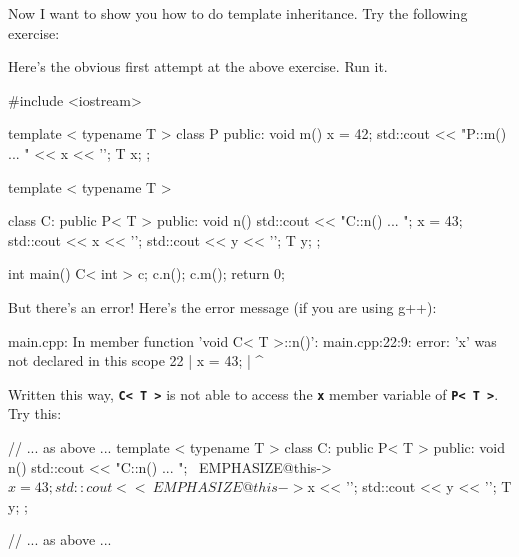 Now I want to show you how to do template inheritance. Try the following
exercise:

Here's the obvious first attempt at the above exercise. Run it.
\begin{console}
#include <iostream>

template < typename T >
class P
{
public:
        void m()
        {
              x = 42;
              std::cout << "P::m() ... " << x << '\n';
        }
        T x;
};

template < typename T >

class C: public P< T >
{
public:
        void n()
        {
             std::cout << "C::n() ... \n";
             x = 43;
             std::cout << x << '\n';
             std::cout << y << '\n';
        }
        T y;
};

int main()
{   
    C< int > c;
    c.n();
    c.m();
    return 0;
}
\end{console}

But there's an error! Here's the error message (if you are using g++):
\begin{console}
main.cpp: In member function 'void C< T >::n()':
main.cpp:22:9: error: 'x' was not declared in this
scope
22 |         x = 43;
   |         ^ 
\end{console}

Written this way, \texttt{\textbf{C< T >}} is not able to access the \texttt{\textbf{x}} member variable of \texttt{\textbf{P< T >}}. Try this:
\begin{console}[commandchars=\~\@\$]
// ... as above ...
template < typename T >
class C: public P< T >
{
public:
        void n()
        {
             std::cout << "C::n() ... \n";
             ~EMPHASIZE@this->$x = 43;
             std::cout << ~EMPHASIZE@this->$x << '\n';
             std::cout << y << '\n';
        }
        T y;
};

// ... as above ...
\end{console}
